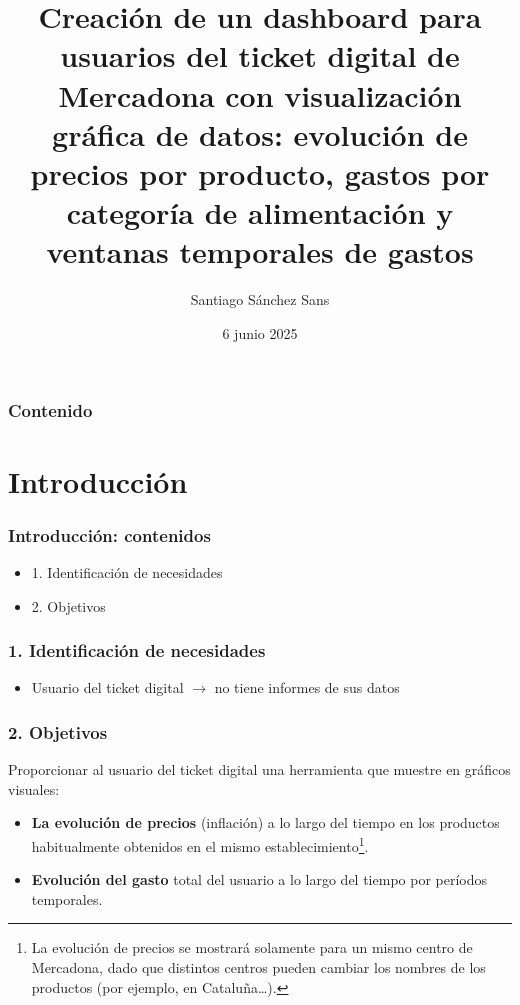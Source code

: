 \documentclass{beamer}
\title[Creación de un dashboard para usuarios del ticket digital de Mercadona]{Creación de un dashboard para usuarios del ticket digital de Mercadona con visualización gráfica de datos: evolución de precios por producto, gastos por categoría de alimentación y ventanas temporales de gastos}
\author{Santiago Sánchez Sans}
\institute{IES Abastos}
\date{6 junio 2025} %
\begin{document}



	
	\begin{frame}
		\titlepage
	\end{frame}
	
	\begin{frame}
		\frametitle{Contenido}
		\tableofcontents
	\end{frame}
	
	
	
	
	
	
	
	\section{Introducción}
	
		\begin{frame}
			\frametitle{\textbf{Introducción}: contenidos}
			\begin{itemize}
				\item 1. Identificación de necesidades
				\item 2. Objetivos 
			\end{itemize}
		\end{frame}
		
		
			\begin{frame}
				\frametitle{1. Identificación de necesidades}
				\begin{itemize}
					\item Usuario del ticket digital $\rightarrow$ no tiene informes de sus datos 
				\end{itemize}
			\end{frame}
			
			
			
			\begin{frame}
				\frametitle{2. Objetivos}
				Proporcionar al
				usuario del ticket digital una herramienta que muestre en gráficos visuales:
				\begin{itemize}
				\item \textbf{La evolución de precios} (inflación) a lo largo del tiempo en los productos habitualmente obtenidos en el mismo establecimiento\footnote{La evolución de precios se mostrará solamente para un mismo centro de Mercadona, dado que distintos centros pueden cambiar los nombres de los productos (por ejemplo, en Cataluña…).}.
				\item \textbf{Evolución del gasto} total del usuario a lo largo del tiempo por períodos temporales.
				\end{itemize}
			\end{frame}
	
\end{document}
